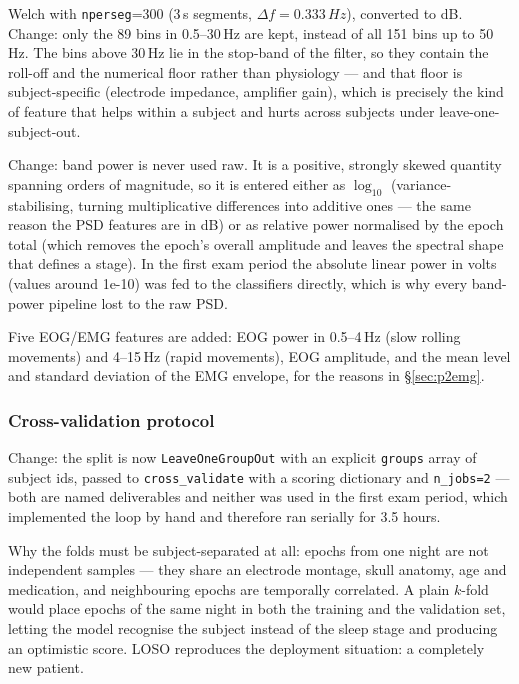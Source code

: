 \documentclass[11pt,a4paper]{article}
\newcommand{\hertz}{Hz}
\newcommand{\second}{s}
\newcommand{\num}[1]{#1}
\newcommand{\SI}[2]{#1\,#2}
\newcommand{\SIrange}[3]{#1--#2\,#3}
\newcommand{\change}[1]{\textcolor{black!70}{\textsf{\footnotesize #1}}}
\begin{document}
Welch with \texttt{nperseg}=\num{300} (\SI{3}{\second} segments,
$\Delta f = \SI{0.333}{\hertz}$), converted to dB. \change{Change: only the \num{89} bins in
\SIrange{0.5}{30}{\hertz} are kept, instead of all \num{151} bins up to \SI{50}{\hertz}. The
bins above \SI{30}{\hertz} lie in the stop-band of the filter, so they contain the roll-off and
the numerical floor rather than physiology --- and that floor is subject-specific (electrode
impedance, amplifier gain), which is precisely the kind of feature that helps within a subject
and hurts across subjects under leave-one-subject-out.}

\change{Change: band power is never used raw. It is a positive, strongly skewed quantity
spanning orders of magnitude, so it is entered either as $\log_{10}$ (variance-stabilising,
turning multiplicative differences into additive ones --- the same reason the PSD features are
in dB) or as relative power normalised by the epoch total (which removes the epoch's overall
amplitude and leaves the spectral shape that defines a stage). In the first exam period the
absolute linear power in volts (values around \num{1e-10}) was fed to the classifiers directly,
which is why every band-power pipeline lost to the raw PSD.}

Five EOG/EMG features are added: EOG power in \SIrange{0.5}{4}{\hertz} (slow rolling movements)
and \SIrange{4}{15}{\hertz} (rapid movements), EOG amplitude, and the mean level and standard
deviation of the EMG envelope, for the reasons in \S\ref{sec:p2emg}.

\subsubsection{Cross-validation protocol}
\label{sec:p2cv}

\change{Change: the split is now \texttt{LeaveOneGroupOut} with an explicit \texttt{groups}
array of subject ids, passed to \texttt{cross\_validate} with a scoring dictionary and
\texttt{n\_jobs=2} --- both are named deliverables and neither was used in the first exam
period, which implemented the loop by hand and therefore ran serially for 3.5 hours.}

Why the folds must be subject-separated at all: epochs from one night are not independent
samples --- they share an electrode montage, skull anatomy, age and medication, and neighbouring
epochs are temporally correlated. A plain $k$-fold would place epochs of the same night in both
the training and the validation set, letting the model recognise the subject instead of the
sleep stage and producing an optimistic score. LOSO reproduces the deployment situation: a
completely new patient.
\end{document}
